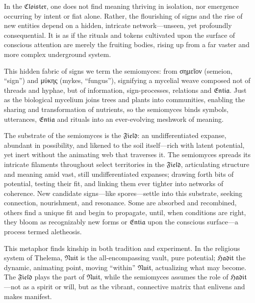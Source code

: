 
In the $\mathfrak{Cloister}$, one does not find meaning thriving in isolation,
nor emergence occurring by intent or fiat alone. Rather, the flourishing of
signs and the rise of new entities depend on a hidden, intricate
network—unseen, yet profoundly consequential. It is as if the rituals and
tokens cultivated upon the surface of conscious attention are merely the
fruiting bodies, rising up from a far vaster and more complex underground
system.

This hidden fabric of signs we term the \gls{semiomyces}: from σημεῖον
(semeion, “sign”) and μύκης (mykes, “fungus”), signifying a mycelial weave
composed not of threads and hyphae, but of information, sign-processes,
relations and $\mathfrak{Entia}$.  Just as the biological mycelium joins trees
and plants into communities, enabling the sharing and transformation of
nutrients, so the semiomyces binds symbols, utterances, $\mathfrak{Entia}$ and
rituals into an ever-evolving meshwork of meaning.

The substrate of the semiomyces is the $\mathfrak{Field}$: an undifferentiated
expanse, abundant in possibility, and likened to the soil itself—rich with
latent potential, yet inert without the animating web that traverses it. The
semiomyces spreads its intricate filaments throughout select territories in the
$\mathfrak{Field}$, articulating structure and meaning amid vast, still undifferentiated
expanses; drawing forth bits of potential, testing their fit, and linking them
ever tighter into networks of coherence. New candidate signs—like spores—settle
into this substrate, seeking connection, nourishment, and resonance. Some are
absorbed and recombined, others find a unique fit and begin to propagate,
until, when conditions are right, they bloom as recognizably new forms or
$\mathfrak{Entia}$ upon the conscious surface---a process termed
\gls{aletheosis}.

This metaphor finds kinship in both tradition and experiment. In the religious
system of Thelema, $\mathfrak{Nuit}$ is the all-encompassing vault, pure
potential; $\mathfrak{Hadit}$ the dynamic, animating point, moving “within”
$\mathfrak{Nuit}$, actualizing what may become. The $\mathfrak{Field}$ plays
the part of $\mathfrak{Nuit}$, while the semiomyces assumes the role of
$\mathfrak{Hadit}$—not as a spirit or will, but as the vibrant, connective
matrix that enlivens and makes manifest.

